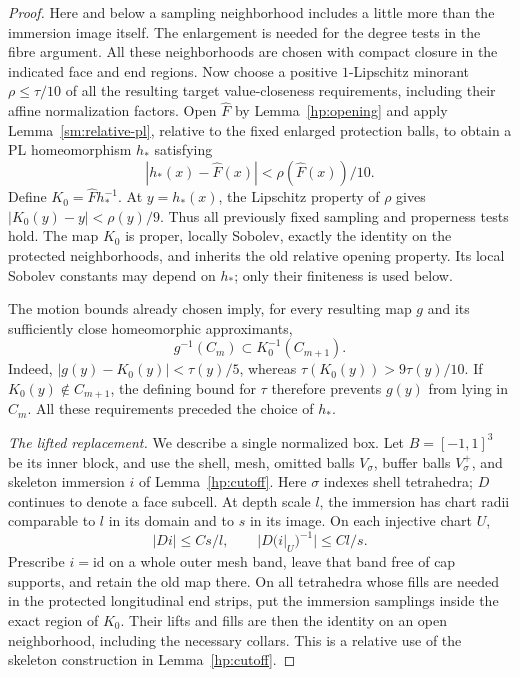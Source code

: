 \documentclass[11pt]{article}
\numberwithin{equation}{section}
\theoremstyle{definition}
\theoremstyle{remark}
\begin{document}
\begin{proof}
Here and below a sampling neighborhood includes a little more than
the immersion image itself.  The enlargement is needed for the
degree tests in the fibre argument.  All these neighborhoods are
chosen with compact closure in the indicated face and end regions.
Now choose a positive $1$-Lipschitz minorant $\rho\leq\tau/10$ of
all the resulting target value-closeness requirements, including their
affine normalization factors.  Open $\widehat F$ by
Lemma~\ref{hp:opening} and apply Lemma~\ref{sm:relative-pl}, relative
to the fixed enlarged protection balls, to obtain a PL homeomorphism
$h_*$ satisfying
\[
 |h_*(x)-\widehat F(x)|<\rho(\widehat F(x))/10.
\]
Define $K_0=\widehat Fh_*^{-1}$.  At $y=h_*(x)$, the Lipschitz
property of $\rho$ gives
$|K_0(y)-y|<\rho(y)/9$.  Thus all previously fixed sampling and
properness tests hold.  The map $K_0$ is proper, locally Sobolev,
exactly the identity on the protected neighborhoods, and inherits
the old relative opening property.  Its local Sobolev constants may
depend on $h_*$; only their finiteness is used below.

The motion bounds already chosen imply, for every resulting map $g$
and its sufficiently close homeomorphic approximants,
\begin{equation}\label{qt:central-proper-localization}
 g^{-1}(C_m)\subset K_0^{-1}(C_{m+1}).
\end{equation}
Indeed, $|g(y)-K_0(y)|<\tau(y)/5$, whereas
$\tau(K_0(y))>9\tau(y)/10$.  If $K_0(y)\notin C_{m+1}$, the defining
bound for $\tau$ therefore prevents $g(y)$ from lying in $C_m$.
All these requirements preceded the choice of $h_*$.

\emph{The lifted replacement.}
We describe a single normalized box.  Let $B=[-1,1]^3$ be its inner
block, and use the shell, mesh, omitted balls $V_{\sigma}$, buffer balls
$V_{\sigma}^+$, and skeleton immersion $i$ of Lemma~\ref{hp:cutoff}.
Here $\sigma$ indexes shell tetrahedra; $D$ continues to denote a
face subcell.  At depth scale $l$, the immersion has chart radii
comparable to $l$ in its domain
and to $s$ in its image.  On each injective chart $U$,
\[
 |Di|\le C s/l,\qquad |D(i|_U)^{-1}|\le C l/s.
\]
Prescribe $i=\mathrm{id}$ on a whole outer mesh band, leave that
band free of cap supports, and retain the old map there.  On all
tetrahedra whose fills are needed in the protected longitudinal end
strips, put the immersion samplings inside the exact region of
$K_0$.  Their lifts and fills are then the identity on an open
neighborhood, including the necessary collars.  This is a relative
use of the skeleton construction in Lemma~\ref{hp:cutoff}.


\end{proof}
\end{document}
